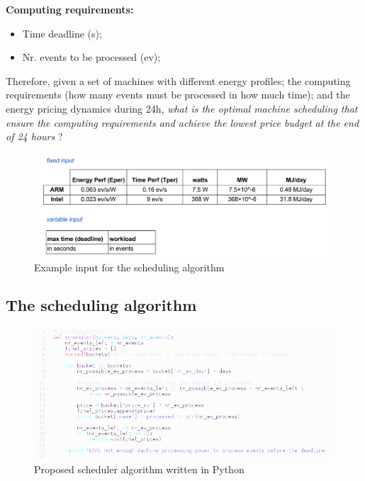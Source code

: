\vspace{5mm}

\textbf{Computing requirements:}
\begin{itemize}
  \item[] Time deadline (s);
  \item[] Nr. events to be processed (ev);
\end{itemize}

\vspace{10mm}

Therefore, given a set of machines with different energy profiles; the computing requirements (how many events must be processed in how much time); and the energy pricing dynamics during 24h, \textit{what is the optimal machine scheduling that ensure the computing requirements and achieve the lowest price budget at the end of 24 hours} ?

\begin{figure}[h]
  \centering
    \includegraphics[width=150mm]{"img/input"}
    \caption{Example input for the scheduling algorithm}
    \label{fig:input}
\end{figure}


\subsection*{The scheduling algorithm}

\begin{figure}[h]
  \centering
    \includegraphics[width=150mm]{"img/scheduler_code2"}
    \caption{Proposed scheduler algorithm written in Python}
    \label{fig:scheduler_code}
\end{figure}

